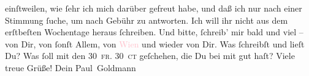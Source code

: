                einſtweilen, wie ſehr ich mich darüber gefreut habe, und daß ich nur nach einer
               Stimmung ſuche, um nach Gebühr zu antworten. Ich will ihr nicht aus dem erſtbeſten
               Wochentage heraus ſchreiben.\pend
           \pstart
           Und bitte, ſchreib’ mir bald und viel – von Dir, von ſonſt Allem, von \textcolor{pink}{Wien}{}\ledrightnote{\textcolor{pink}{Wien}} und wieder von Dir. Was ſchreibſt und lieſt
               Du? Was ſoll mit den \textsc{30 fr. 30 ct} geſchehen, die Du bei mit
               gut haſt? Viele treue Grüße! Dein\pend
           \pstart \spacefill\mbox{Paul Goldmann}\pend{}\endnumbering{}  
      